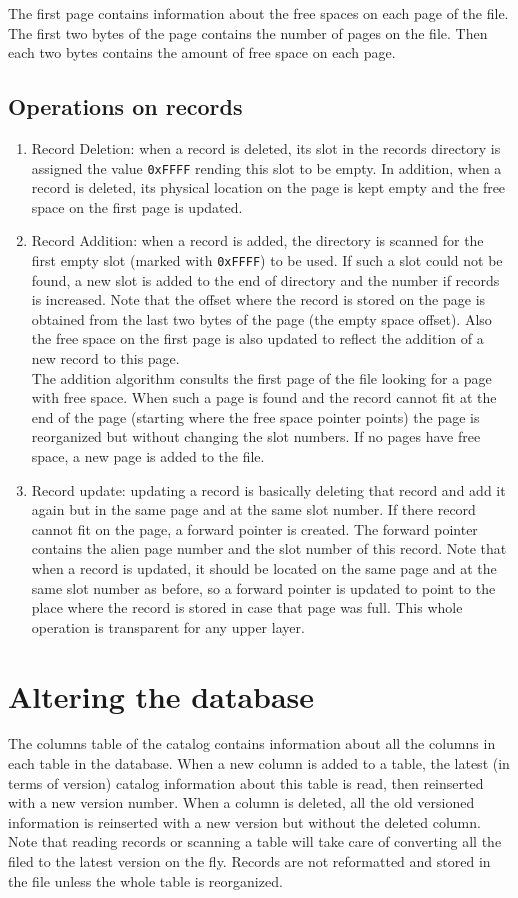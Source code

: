 \documentclass[a4paper,12pt]{article}
\begin{document}
The first page contains information about the free spaces on each page of the file. The first two bytes of the page contains the number of pages on the file. Then each two bytes contains the amount of free space on each page.

\subsection{Operations on records}
\begin{enumerate}
\item Record Deletion: when a record is deleted, its slot in the records directory is assigned the value \texttt{0xFFFF} rending this slot to be empty. In addition, when a record is deleted, its physical location on the page is kept empty and the free space on the first page is updated.
\item Record Addition: when a record is added, the directory is scanned for the first empty slot (marked with \texttt{0xFFFF}) to be used. If such a slot could not be found, a new slot is added to the end of directory and the number if records is increased. Note that the offset where the record is stored on the page is obtained from the last two bytes of the page (the empty space offset). Also the free space on the first page is also updated to reflect the addition of a new record to this page.\\
The addition algorithm consults the first page of the file looking for a page with free space. When such a page is found and the record cannot fit at the end of the page (starting where the free space pointer points) the page is reorganized but without changing the slot numbers. If no pages have free space, a new page is added to the file.
\item Record update: updating a record is basically deleting that record and add it again but in the same page and at the same slot number. If there record cannot fit on the page, a forward pointer is created. The forward pointer contains the alien page number and the slot number of this record. Note that when a record is updated, it should be located on the same page and at the same slot number as before, so a forward pointer is updated to point to the place where the record is stored in case that page was full. This whole operation is transparent for any upper layer.
\end{enumerate}

\section{Altering the database}
The columns table of the catalog contains information about all the columns in each table in the database. When a new column is added to a table, the latest (in terms of version) catalog information about this table is read, then reinserted with a new version number. When a column is deleted, all the old versioned information is reinserted with a new version but without the deleted column. Note that reading records or scanning a table will take care of converting all the filed to the latest version on the fly. Records are not reformatted and stored in the file unless the whole table is reorganized.
\end{document}
